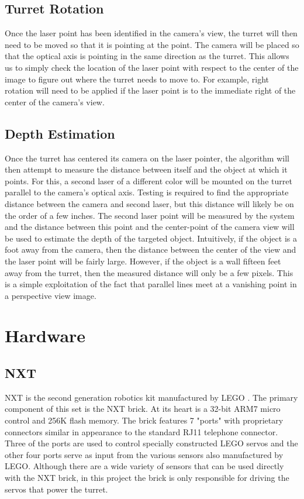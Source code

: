 \documentclass[10pt,twocolumn,letterpaper]{article}
\begin{document}
\subsection{Turret Rotation}

Once the laser point has been identified in the camera's view, the turret will then need to be moved so that it is pointing at the point. The camera will be placed so that the optical axis is pointing in the same direction as the turret. This allows us to simply check the location of the laser point with respect to the center of the image to figure out where the turret needs to move to. For example, right rotation will need to be applied if the laser point is to the immediate right of the center of the camera's view.




\subsection{Depth Estimation}

Once the turret has centered its camera on the laser pointer, the algorithm will then attempt to measure the distance between itself and the object at which it points.  For this, a second laser of a different color will be mounted on the turret parallel to the camera's optical axis.  Testing is required to find the appropriate distance between the camera and second laser, but this distance will likely be on the order of a few inches.  The second laser point will be measured by the system and the distance between this point and the center-point of the camera view will be used to estimate the depth of the targeted object.  Intuitively, if the object is a foot away from the camera, then the distance between the center of the view and the laser point will be fairly large.  However, if the object is a wall fifteen feet away from the turret, then the measured distance will only be a few pixels.  This is a simple exploitation of the fact that parallel lines meet at a vanishing point in a perspective view image. 
\section{Hardware}

\subsection{NXT}
NXT is the second generation robotics kit manufactured by LEGO \cite{nxt}. The primary component of this set is the NXT brick. At its heart is a 32-bit ARM7 micro control and 256K flash memory. The brick features 7 "ports" with proprietary connectors similar in appearance to the standard RJ11 telephone connector. Three of the ports are used to control specially constructed LEGO servos and the other four ports serve as input from the various sensors also manufactured by LEGO. Although there are a wide variety of sensors that can be used directly with the NXT brick, in this project the brick is only responsible for driving the servos that power the turret.
\end{document}
